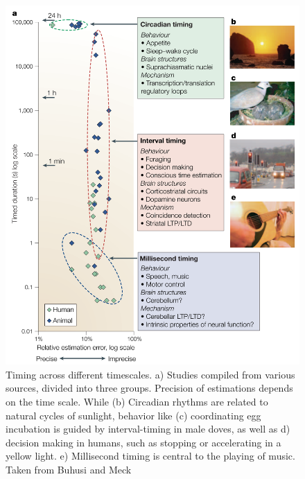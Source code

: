     \begin{figure}
        \centering
        \includegraphics[width=.95\textwidth]{figures/sketches/timescales.png}
        \caption[Timing across different timescales.]{Timing across different timescales. a) Studies compiled from various sources, divided into three groups. Precision of estimations depends on the time scale. While (b) Circadian rhythms are related to natural cycles of sunlight, behavior like (c) coordinating egg incubation is guided by interval-timing in male doves, as well as d) decision making in humans, such as stopping or accelerating in a yellow light. e) Millisecond timing is central to the playing of music. Taken from Buhusi and Meck \cite{buhusi2005makes}}
        \label{fig:timescales}
    \end{figure}
    
